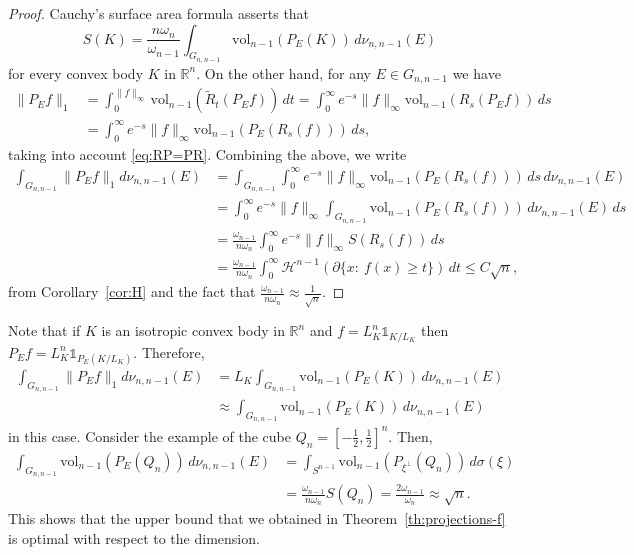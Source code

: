 \documentclass[11pt,leqno]{article}
\theoremstyle{definition}
\theoremstyle{remark}
\numberwithin{equation}{section}
\newcommand{\ls}{\leqslant}
\newcommand{\1}{\textbf{1}}
\newcommand{\vol}{\mathrm{vol}}
\begin{document}
\begin{proof}Cauchy's surface area formula asserts that
\begin{equation}\label{eq:cauchy}S(K)= \frac{n\omega_n}{\omega_{n-1}}\int_{G_{n,n-1}}\vol_{n-1}(P_E(K))\,d\nu_{n,n-1}(E)\end{equation}
for every convex body $K$ in $\mathbb{R}^n$. On the other hand, for any $E\in G_{n,n-1}$ we have
\begin{align*}\|P_Ef\|_1 &=\int_0^{\|f\|_{\infty}}\vol_{n-1}(\tilde{R}_t(P_Ef))\,dt=\int_0^{\infty}e^{-s}\|f\|_{\infty}\vol_{n-1}(R_s(P_Ef))\,ds\\
&=\int_0^{\infty}e^{-s}\|f\|_{\infty}\vol_{n-1}(P_E(R_s(f)))\,ds,
\end{align*}
taking into account \eqref{eq:RP=PR}. Combining the above, we write
\begin{align*}\int_{G_{n,n-1}}\|P_Ef\|_1d\nu_{n,n-1}(E) &=\int_{G_{n,n-1}}\int_0^{\infty}e^{-s}\|f\|_{\infty}\vol_{n-1}(P_E(R_s(f)))\,ds\,d\nu_{n,n-1}(E)\\
&=\int_0^{\infty}e^{-s}\|f\|_{\infty}\int_{G_{n,n-1}}\vol_{n-1}(P_E(R_s(f)))\,d\nu_{n,n-1}(E)\,ds\\
&=\frac{\omega_{n-1}}{n\omega_n}\int_0^{\infty}e^{-s}\|f\|_{\infty}S(R_s(f))\,ds\\
&=\frac{\omega_{n-1}}{n\omega_n}\int_0^\infty \mathcal{H}^{n-1}(\partial\{x: \ f(x)\geq t\}) \, dt\ls C\sqrt{n},
\end{align*}
from Corollary~\ref{cor:H} and the fact that $\frac{\omega_{n-1}}{n\omega_n}\approx \frac{1}{\sqrt{n}}$.
\end{proof}

Note that if $K$ is an isotropic convex body in $\mathbb{R}^n$ and $f=L_K^n\mathds{1}_{K/L_K}$ then $P_Ef=L_K^n\mathds{1}_{P_E(K/L_K)}$. Therefore,
\begin{align*}\int_{G_{n,n-1}}\|P_Ef\|_1d\nu_{n,n-1}(E) &=L_K\int_{G_{n,n-1}}\vol_{n-1}(P_E(K))\,d\nu_{n,n-1}(E)\\
&\approx \int_{G_{n,n-1}}\vol_{n-1}(P_E(K))\,d\nu_{n,n-1}(E)
\end{align*}
in this case. Consider the example of the cube $Q_n=\left[-\tfrac{1}{2},\tfrac{1}{2}\right]^n$. Then,
\begin{align*}\int_{G_{n,n-1}}\vol_{n-1}(P_E(Q_n))\,d\nu_{n,n-1}(E) &=\int_{S^{n-1}}\vol_{n-1}(P_{\xi^{\perp}}(Q_n))\,d\sigma(\xi)\\
&=\frac{\omega_{n-1}}{n\omega_n}S(Q_n)=\frac{2\omega_{n-1}}{\omega_n}\approx\sqrt{n}.
\end{align*}
This shows that the upper bound that we obtained in Theorem~\ref{th:projections-f} is optimal with respect to the dimension.
\end{document}
